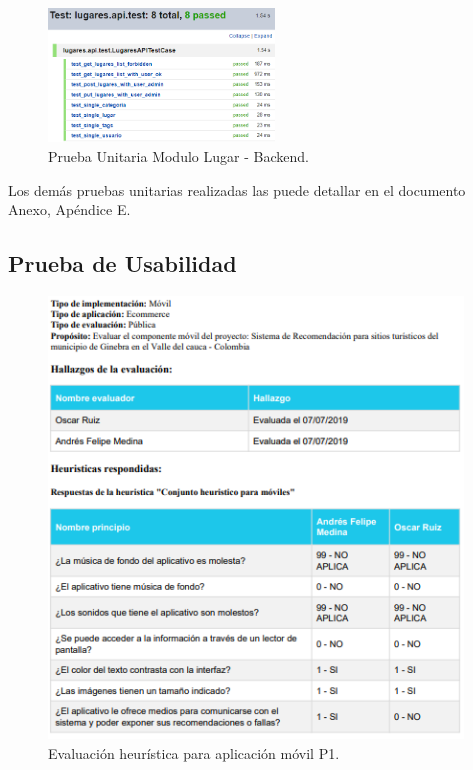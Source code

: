 \documentclass[12pt,letterpaper,openany]{book}
\begin{document}
\begin{figure}[H]
\begin{center}
\includegraphics[width=6cm]{./imagenes/Test/Backend/Test__lugares_api_test}
\caption{Prueba Unitaria Modulo Lugar - Backend.}
\end{center}
\end{figure}

Los demás pruebas unitarias realizadas las puede detallar en el documento Anexo, Apéndice E.

\subsection{Prueba de Usabilidad}
\begin{figure}[H]
\begin{center}
\includegraphics[width=11cm]{./imagenes/R1}
\caption{Evaluación heurística para aplicación móvil P1.}
\end{center}
\end{figure}
\end{document}
